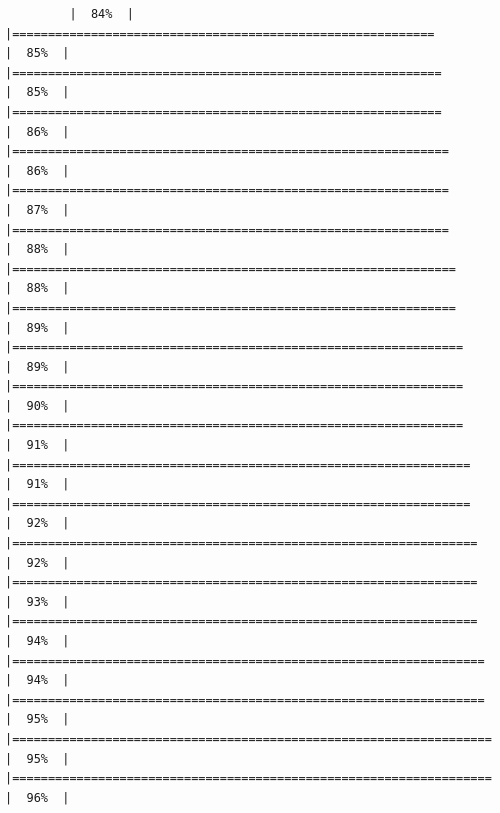 \documentclass[
  ignorenonframetext,
]{beamer}
\begin{document}
\begin{frame}[fragile]{}
\begin{verbatim}
         |  84%  |                                                                              |===========================================================           |  85%  |                                                                              |============================================================          |  85%  |                                                                              |============================================================          |  86%  |                                                                              |=============================================================         |  86%  |                                                                              |=============================================================         |  87%  |                                                                              |=============================================================         |  88%  |                                                                              |==============================================================        |  88%  |                                                                              |==============================================================        |  89%  |                                                                              |===============================================================       |  89%  |                                                                              |===============================================================       |  90%  |                                                                              |===============================================================       |  91%  |                                                                              |================================================================      |  91%  |                                                                              |================================================================      |  92%  |                                                                              |=================================================================     |  92%  |                                                                              |=================================================================     |  93%  |                                                                              |=================================================================     |  94%  |                                                                              |==================================================================    |  94%  |                                                                              |==================================================================    |  95%  |                                                                              |===================================================================   |  95%  |                                                                              |===================================================================   |  96%  |                                                                              
\end{verbatim}
\end{frame}
\end{document}
